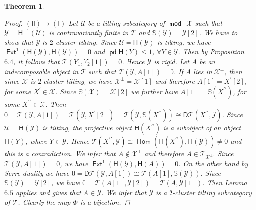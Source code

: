 \documentclass[oneside, a4paper,reqno]{amsart}
\numberwithin{equation}{section}
\newtheorem{thm}{Theorem}[section]
\theoremstyle{definition}
\begin{document}
\begin{thm}
\begin{proof}
$\mathsf{(II)} {\longrightarrow} \mathsf{(I)}$ Let ${\mathcal U}$ be a tilting subcategory of $\operatorname*{\mathsf{mod}-\!}{\mathcal X}$ such that  ${\mathcal Y} = \mathsf{H}^{-1}({\mathcal U})$ is contravariantly finite in ${\mathcal T}$ and $\mathbb S({\mathcal Y}) = {\mathcal Y}[2]$. We have to show that ${\mathcal Y}$ is $2$-cluster tilting. Since ${\mathcal U} = \mathsf{H}({\mathcal Y})$ is tilting,  we have $\operatorname*{\mathsf{Ext}}^{1}(\mathsf{H}({\mathcal Y}),\mathsf{H}({\mathcal Y})) = 0$ and $\operatorname{\mathsf{pd}}\mathsf{H}(Y) \leq 1$, $\forall Y \in {\mathcal Y}$. Then by Proposition $6.4$, it follows that ${\mathcal T}(Y_{1},Y_{2}[1]) = 0$. Hence ${\mathcal Y}$ is rigid. Let $A$ be an indecomposable object in ${\mathcal T}$ such that ${\mathcal T}({\mathcal Y},A[1]) = 0$. If $A$ lies in ${\mathcal X}^{\bot}$, then since ${\mathcal X}$ is $2$-cluster tilting, we have ${\mathcal X}^{\bot}  = {\mathcal X}[1]$ and therefore $A[1] = X^{\prime}[2]$, for some $X^{\prime} \in {\mathcal X}$. Since $\mathbb S({\mathcal X}) = {\mathcal X}[2]$ we further have $A[1] = \mathbb S(X^{\prime\prime})$, for some $X^{\prime\prime} \in {\mathcal X}$. Then $0 = {\mathcal T}({\mathcal Y},A[1]) = {\mathcal T}({\mathcal Y},X^{\prime}[2])  = {\mathcal T}({\mathcal Y},\mathbb S(X^{\prime\prime}))\cong \mathsf{D}{\mathcal T}(X^{\prime\prime},{\mathcal Y})$. Since ${\mathcal U} = \mathsf{H}({\mathcal Y})$ is tilting, the projective object $\mathsf{H}(X^{\prime\prime})$ is a subobject of an object $\mathsf{H}(Y)$, where $Y \in {\mathcal Y}$. Hence ${\mathcal T}(X^{\prime\prime},{\mathcal Y}) \cong \operatorname{\mathsf{Hom}}(\mathsf{H}(X^{\prime\prime}),\mathsf{H}({\mathcal Y})) \neq 0$ and this is a contradiction. We infer that $A \notin {\mathcal X}^{\bot}$ and therefore $A \in {\mathcal T}_{{\mathcal X}^{\bot}}$. Since ${\mathcal T}({\mathcal Y},A[1]) = 0$, we have $\operatorname*{\mathsf{Ext}}^{1}(\mathsf{H}({\mathcal Y}),\mathsf{H}(A)) = 0$. On the other hand  by Serre duality we have $0  = \mathsf{D}{\mathcal T}({\mathcal Y},A[1]) \cong {\mathcal T}(A[1],\mathbb S({\mathcal Y}))$. Since $\mathbb S({\mathcal Y}) = {\mathcal Y}[2]$, we have $ 0 = {\mathcal T}(A[1],\mathbb {\mathcal Y}[2]) = {\mathcal T}(A,{\mathcal Y}[1])$. Then Lemma $6.5$ applies and gives that  $A \in {\mathcal Y}$. We infer that ${\mathcal Y}$ is a $2$-cluster tilting subcategory of ${\mathcal T}$. Clearly the map $\Phi$ is a bijection.
\end{proof}
\end{thm} 
\end{document}
